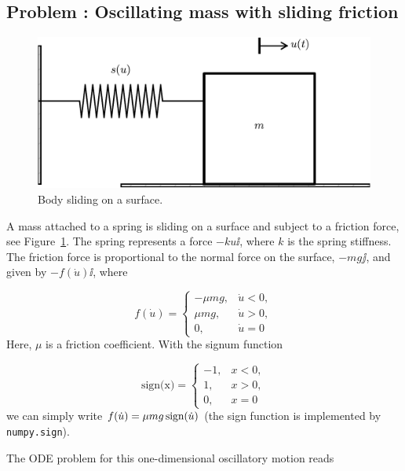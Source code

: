 \documentclass[graybox,envcountchap,sectrefs,final]{svmonodo}
\newenvironment{doconceexercise}{}{}
\newcounter{doconceexercisecounter}
\begin{document}
\begin{doconceexercise}

\subsection*{Problem \thedoconceexercisecounter: Oscillating mass with sliding friction}

\label{scale:vib:exer:sliding}


\begin{figure}[!ht]  %
  \centerline{\includegraphics[width=0.7\linewidth]{fig-scaling/oscillator_sliding.pdf}}
  \caption{
  Body sliding on a surface. \label{scale:vib:exer:sliding:fig}
  }
\end{figure}


A mass attached to a spring is sliding on a surface and subject to
a friction force, see Figure~\ref{scale:vib:exer:sliding:fig}.
The spring represents a force $-ku\ii$, where $k$ is the spring stiffness.
The friction force is proportional to the normal force on the surface,
$-mg\jj$, and given by $-f(\dot u)\ii$, where

\[ f(\dot u) = \left\lbrace\begin{array}{ll}
-\mu mg,& \dot u < 0,\\ 
\mu mg, & \dot u > 0,\\ 
0,      & \dot u=0
\end{array}\right.\]
Here, $\mu$ is a friction coefficient. With the signum function

\[ \mbox{sign(x)} = \left\lbrace\begin{array}{ll}
-1,& x < 0,\\ 
1, & x > 0,\\ 
0, & x=0
\end{array}\right.\]
we can simply write $f(\dot u) = \mu mg\,\hbox{sign}(\dot u)$
(the sign function is implemented by \texttt{numpy.sign}).

The ODE problem for this one-dimensional oscillatory motion reads


\end{doconceexercise}
\end{document}
